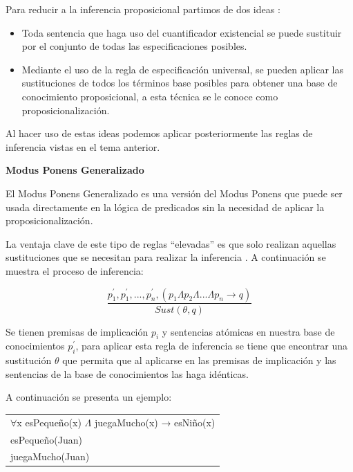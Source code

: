\documentclass[11pt,fleqn]{book} %
\begin{document}
Para reducir a la inferencia proposicional partimos de dos ideas \cite{russell2004inteligencia}:

\begin{itemize}
\item Toda sentencia que haga uso del cuantificador existencial se puede sustituir por el conjunto de todas las especificaciones posibles.
\item Mediante el uso de la regla de especificación universal, se pueden aplicar las sustituciones de todos los términos base posibles para obtener una base de conocimiento proposicional, a esta técnica se le conoce como proposicionalización.

\end{itemize}

Al hacer uso de estas ideas podemos aplicar posteriormente las reglas de inferencia vistas en el tema anterior.

\textbf{Modus Ponens Generalizado}

El Modus Ponens Generalizado es una versión del Modus Ponens que puede ser usada directamente en la lógica de predicados sin la necesidad de aplicar la proposicionalización.

La ventaja clave de este tipo de reglas “elevadas” es que solo realizan aquellas sustituciones que se necesitan para realizar la inferencia \cite{russell2004inteligencia}. A continuación se muestra el proceso de inferencia:

\begingroup
\Large
\begin{equation}
\frac{p_{1}^{'},p_{1}^{'},...,p_{n}^{'},(p_{1} \Lambda p_{2} \Lambda ... \Lambda p_{n} \rightarrow q)}{Sust(\theta,q)}
\end{equation}
\endgroup

Se tienen premisas de implicación $p_i$ y sentencias atómicas en nuestra base de conocimientos $p_{i}^{'}$, para aplicar esta regla de inferencia se tiene que encontrar una sustitución $\theta$ que permita que al aplicarse en las premisas de implicación y las sentencias de la base de conocimientos las haga idénticas.

A continuación se presenta un ejemplo:

\begin{tabular}{l}
	$\forall$x esPequeño(x) $\Lambda$ juegaMucho(x) → esNiño(x)\\
	esPequeño(Juan)\\
	juegaMucho(Juan)\\
\end{tabular}
\end{document}
